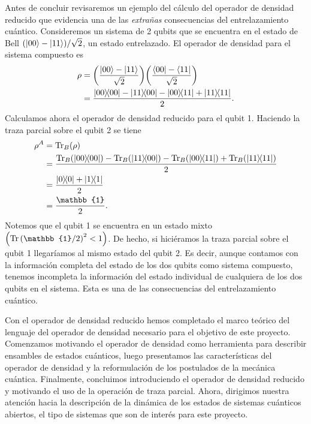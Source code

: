 
Antes de concluir revisaremos un ejemplo del cálculo del 
operador de densidad reducido que evidencia una de las
\textit{extrañas} consecuencias del
entrelazamiento cuántico.
Consideremos un sistema de 2 qubits que se encuentra en el estado de Bell
$\qty(\ket{00}-\ket{11})/\sqrt{2}$, un estado entrelazado. El operador
de densidad para el sistema compuesto es
\begin{align}
	\rho &= \qty(\frac{\ket{00}-\ket{11}}{\sqrt{2}})
	\qty(\frac{\bra{00}-\bra{11}}{\sqrt{2}}) \\
			 &= \frac{\dyad{00}{00}-\dyad{11}{00}-\dyad{00}{11}+\dyad{11}{11}}{2}.
\end{align}
Calculamos ahora el operador de densidad reducido para el qubit 1.  
Haciendo la traza parcial sobre el qubit 2 se tiene
\begin{align}
	\rho^A &= \Tr _B(\rho) \\
			 	 &= \frac{\Tr _B(\dyad{00}{00})-\Tr _B(\dyad{11}{00})
			 	 -\Tr _B(\dyad{00}{11})+\Tr _B(\dyad{11}{11})}{2} \\
			 	 &= \frac{\dyad{0}{0} + \dyad{1}{1}}{2} \\
			 	 &= \frac{\mathbb{1}}{2}.
\end{align}
Notemos que el qubit 1 se encuentra en un estado mixto
$\qty(\Tr \qty(\mathbb{1}/2)^2<1)$. De hecho, si hiciéramos la 
traza parcial sobre el qubit 1 llegaríamos al mismo estado del qubit 2.
Es decir, aunque contamos con la información completa del estado 
de los dos qubits como sistema compuesto, tenemos incompleta la 
información del estado individual de cualquiera de los dos qubits
en el sistema. Esta es una de las consecuencias del entrelazamiento
cuántico.

Con el operador de densidad reducido hemos completado
el marco teórico del lenguaje del operador de densidad necesario
para el objetivo de este proyecto. Comenzamos
motivando el operador de densidad como herramienta 
para describir ensambles de
estados cuánticos, luego presentamos las características
del operador de densidad y la reformulación de los postulados 
de la mecánica cuántica.
Finalmente, concluimos introduciendo el operador de densidad reducido y
motivando el uso de la operación de traza parcial. Ahora, dirigimos
nuestra atención hacia la descripción de la dinámica de los estados
de sistemas cuánticos abiertos, el tipo de sistemas que son de interés
para este proyecto.

